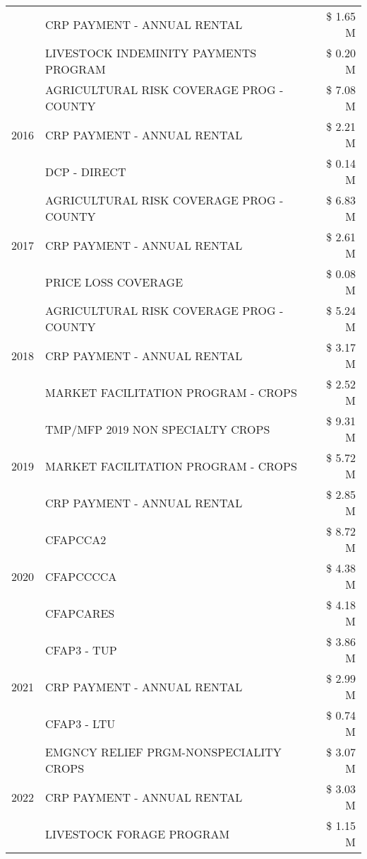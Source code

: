 \begin{tabular}{llr}
 & CRP PAYMENT - ANNUAL RENTAL & \$ 1.65 M \\
 & LIVESTOCK INDEMINITY PAYMENTS PROGRAM & \$ 0.20 M \\
\cline{1-3}
\multirow[t]{3}{*}{2016} & AGRICULTURAL RISK COVERAGE PROG - COUNTY & \$ 7.08 M \\
 & CRP PAYMENT - ANNUAL RENTAL & \$ 2.21 M \\
 & DCP - DIRECT & \$ 0.14 M \\
\cline{1-3}
\multirow[t]{3}{*}{2017} & AGRICULTURAL RISK COVERAGE PROG - COUNTY & \$ 6.83 M \\
 & CRP PAYMENT - ANNUAL RENTAL & \$ 2.61 M \\
 & PRICE LOSS COVERAGE & \$ 0.08 M \\
\cline{1-3}
\multirow[t]{3}{*}{2018} & AGRICULTURAL RISK COVERAGE PROG - COUNTY & \$ 5.24 M \\
 & CRP PAYMENT - ANNUAL RENTAL & \$ 3.17 M \\
 & MARKET FACILITATION PROGRAM - CROPS & \$ 2.52 M \\
\cline{1-3}
\multirow[t]{3}{*}{2019} & TMP/MFP 2019 NON SPECIALTY CROPS & \$ 9.31 M \\
 & MARKET FACILITATION PROGRAM - CROPS & \$ 5.72 M \\
 & CRP PAYMENT - ANNUAL RENTAL & \$ 2.85 M \\
\cline{1-3}
\multirow[t]{3}{*}{2020} & CFAPCCA2 & \$ 8.72 M \\
 & CFAPCCCCA & \$ 4.38 M \\
 & CFAPCARES & \$ 4.18 M \\
\cline{1-3}
\multirow[t]{3}{*}{2021} & CFAP3 - TUP & \$ 3.86 M \\
 & CRP PAYMENT - ANNUAL RENTAL & \$ 2.99 M \\
 & CFAP3 - LTU & \$ 0.74 M \\
\cline{1-3}
\multirow[t]{3}{*}{2022} & EMGNCY RELIEF PRGM-NONSPECIALITY CROPS & \$ 3.07 M \\
 & CRP PAYMENT - ANNUAL RENTAL & \$ 3.03 M \\
 & LIVESTOCK FORAGE PROGRAM & \$ 1.15 M \\
\cline{1-3}
\bottomrule
\end{tabular}
